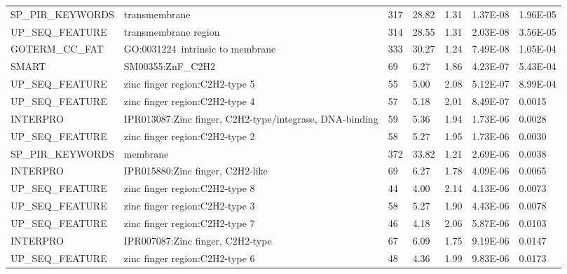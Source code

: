 \documentclass[a4paper,10pt,oneside]{book}
\begin{document}
{\begin{longtable}{lllllll}
SP\_PIR\_KEYWORDS & transmembrane                                                   & 317   & 28.82 & 1.31            & 1.37E-08 & 1.96E-05 \\
UP\_SEQ\_FEATURE  & transmembrane region                                            & 314   & 28.55 & 1.31            & 2.03E-08 & 3.56E-05 \\
GOTERM\_CC\_FAT   & GO:0031224~intrinsic to membrane                                & 333   & 30.27 & 1.24            & 7.49E-08 & 1.05E-04 \\
SMART             & SM00355:ZnF\_C2H2                                               & 69    & 6.27  & 1.86            & 4.23E-07 & 5.43E-04 \\
UP\_SEQ\_FEATURE  & zinc finger region:C2H2-type 5                                  & 55    & 5.00  & 2.08            & 5.12E-07 & 8.99E-04 \\
UP\_SEQ\_FEATURE  & zinc finger region:C2H2-type 4                                  & 57    & 5.18  & 2.01            & 8.49E-07 & 0.0015   \\
INTERPRO          & IPR013087:Zinc finger, C2H2-type/integrase, DNA-binding         & 59    & 5.36  & 1.94            & 1.73E-06 & 0.0028   \\
UP\_SEQ\_FEATURE  & zinc finger region:C2H2-type 2                                  & 58    & 5.27  & 1.95            & 1.73E-06 & 0.0030   \\
SP\_PIR\_KEYWORDS & membrane                                                        & 372   & 33.82 & 1.21            & 2.69E-06 & 0.0038   \\
INTERPRO          & IPR015880:Zinc finger, C2H2-like                                & 69    & 6.27  & 1.78            & 4.09E-06 & 0.0065   \\
UP\_SEQ\_FEATURE  & zinc finger region:C2H2-type 8                                  & 44    & 4.00  & 2.14            & 4.13E-06 & 0.0073   \\
UP\_SEQ\_FEATURE  & zinc finger region:C2H2-type 3                                  & 58    & 5.27  & 1.90            & 4.43E-06 & 0.0078   \\
UP\_SEQ\_FEATURE  & zinc finger region:C2H2-type 7                                  & 46    & 4.18  & 2.06            & 5.87E-06 & 0.0103   \\
INTERPRO          & IPR007087:Zinc finger, C2H2-type                                & 67    & 6.09  & 1.75            & 9.19E-06 & 0.0147   \\
UP\_SEQ\_FEATURE  & zinc finger region:C2H2-type 6                                  & 48    & 4.36  & 1.99            & 9.83E-06 & 0.0173  
\end{longtable}
}
\end{document}
